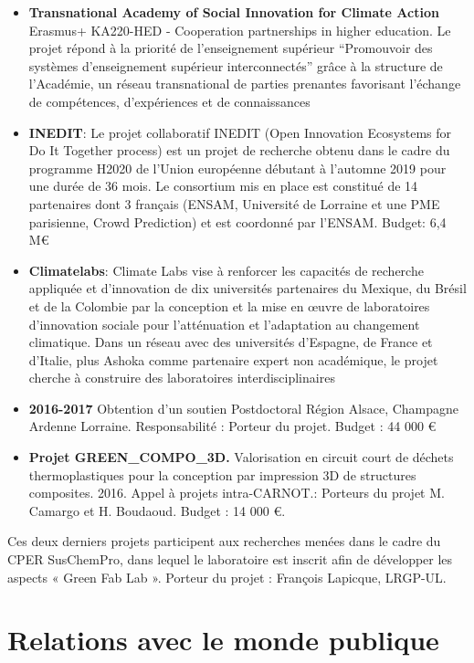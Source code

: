 \documentclass[
  12pt,
  oneside]{book}
\begin{document}
\begin{itemize}
\item
  \textbf{Transnational Academy of Social Innovation for Climate Action} Erasmus+ KA220-HED - Cooperation partnerships in higher education. Le projet répond à la priorité de l'enseignement supérieur ``Promouvoir des systèmes d'enseignement supérieur interconnectés'' grâce à la structure de l'Académie, un réseau transnational de parties prenantes favorisant l'échange de compétences, d'expériences et de connaissances
\item
  \textbf{INEDIT}: Le projet collaboratif INEDIT (Open Innovation Ecosystems for Do It Together process) est un projet de recherche obtenu dans le cadre du programme H2020 de l'Union européenne débutant à l'automne 2019 pour une durée de 36 mois. Le consortium mis en place est constitué de 14 partenaires dont 3 français (ENSAM, Université de Lorraine et une PME parisienne, Crowd Prediction) et est coordonné par l'ENSAM. Budget: 6,4 M€
\item
  \textbf{Climatelabs}: Climate Labs vise à renforcer les capacités de recherche appliquée et d'innovation de dix universités partenaires du Mexique, du Brésil et de la Colombie par la conception et la mise en œuvre de laboratoires d'innovation sociale pour l'atténuation et l'adaptation au changement climatique. Dans un réseau avec des universités d'Espagne, de France et d'Italie, plus Ashoka comme partenaire expert non académique, le projet cherche à construire des laboratoires interdisciplinaires
\item
  \textbf{2016-2017} Obtention d'un soutien Postdoctoral Région Alsace, Champagne Ardenne Lorraine. Responsabilité : Porteur du projet. Budget : 44 000 €
\item
  \textbf{Projet GREEN\_COMPO\_3D.} Valorisation en circuit court de déchets thermoplastiques pour la conception par impression 3D de structures composites. 2016. Appel à projets intra-CARNOT.: Porteurs du projet M. Camargo et H. Boudaoud.
  Budget : 14 000 €.
\end{itemize}

Ces deux derniers projets participent aux recherches menées dans le cadre du CPER SusChemPro, dans lequel le laboratoire est inscrit afin de développer les aspects « Green Fab Lab ». Porteur du projet : François Lapicque, LRGP-UL.

\hypertarget{relations-avec-le-monde-publique}{%
\section{Relations avec le monde publique}\label{relations-avec-le-monde-publique}}
\end{document}
